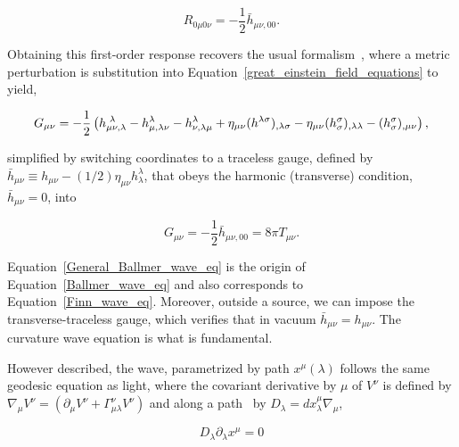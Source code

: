 \begin{equation}
R_{0\mu0\nu} = -\frac{1}{2} \bar{h}_{\mu\nu,00}.
\label{Finn_wave_eq}
\end{equation}


\noindent Obtaining this first-order response recovers the usual formalism~\cite{BallmerThesis}, where a metric perturbation is substitution into Equation~\ref{great_einstein_field_equations} to yield,

\begin{equation}
G_{\mu\nu} = -\frac{1}{2}\left(h_{\mu\nu,\lambda}^{\textup{       }\lambda} - h^\lambda_{\mu,\lambda\nu} -
h^\lambda_{\nu,\lambda\mu} + \eta_{\mu\nu}(h^{\lambda\sigma})_{,\lambda\sigma} - \eta_{\mu\nu}(h_\sigma^\sigma)_{,\lambda\lambda} - (h_\sigma^\sigma)_{,\mu\nu}  \right),
\end{equation}

\noindent simplified by switching coordinates to a traceless gauge, defined by $\bar{h}_{\mu\nu}\equiv h_{\mu\nu} - (1/2)\eta_{\mu\nu}h_\lambda^\lambda$, that obeys the harmonic (transverse) condition, $\bar{h}_{\mu\nu} = 0$, into

\begin{equation}
G_{\mu\nu} = -\frac{1}{2} \bar{h}_{\mu\nu,00} = 8 \pi T_{\mu\nu}.
\label{General_Ballmer_wave_eq}
\end{equation}

\noindent Equation~\ref{General_Ballmer_wave_eq} is the origin of Equation~\ref{Ballmer_wave_eq} and also corresponds to Equation~\ref{Finn_wave_eq}. 
Moreover, outside a source, we can impose the transverse-traceless gauge, which verifies that in vacuum $\bar{h}_{\mu\nu} = h_{\mu\nu}$.
The curvature wave equation is what is fundamental.

However described, the wave, parametrized by path $x^\mu (\lambda)$ follows the same geodesic equation as light, where the covariant derivative by $\mu$ of $V^\nu$ is defined by $\nabla_\mu V^\nu = (\partial_\mu V^\nu + \Gamma^\nu_{\mu\lambda} V^\nu)$ and along a path~\cite{Carroll1997} by $D_\lambda = dx^\mu_\lambda \nabla_\mu$,

\begin{equation}
D_\lambda \partial_\lambda x^\mu = 0
\end{equation}

